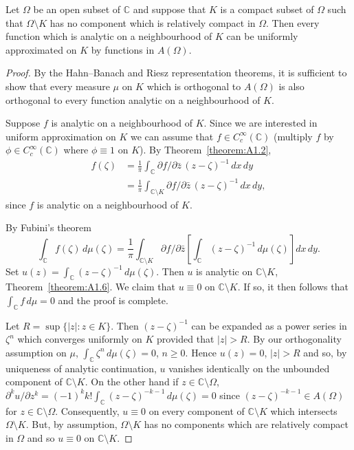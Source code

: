  Let $\Omega$ be an open subset of $\mathbb C$ and suppose that $K$ is a compact subset of $\Omega$ such that $\Omega\setminus K$ has no component which is relatively compact in $\Omega$. Then every function which is analytic on a neighbourhood of $K$ can be uniformly approximated on $K$ by functions in $A(\Omega)$.
\begin{proof}
By the Hahn--Banach and Riesz representation theorems, it is sufficient to show that every measure $\mu$ on $K$ which is orthogonal to $A(\Omega)$ is also orthogonal to every function analytic on a neighbourhood of $K$.

Suppose $f$ is analytic on a neighbourhood of $K$. Since we are interested in uniform approximation on $K$ we can assume that $f\in C_c^\infty(\mathbb C)$ (multiply $f$ by $\phi\in C_c^\infty(\mathbb C)$ where $\phi\equiv1$ on $K$). By Theorem~\ref{theorem:A1.2},
\begin{align*}
f(\zeta)&=\frac1\pi\int_{\mathbb C}\partial f/\partial\bar z\,(z-\zeta)^{-1}\,dx\,dy\\
&=\frac1\pi\int_{\mathbb C\setminus K}\partial f/\partial\bar z\,(z-\zeta)^{-1}\,dx\,dy,
\end{align*}
since $f$ is analytic on a neighbourhood of $K$.

By Fubini's theorem
\[ \int_{\mathbb C}f(\zeta)\,d\mu(\zeta)=\frac1\pi\int_{\mathbb C\setminus K}\partial f/\partial\bar z\left[\int_{\mathbb C}(z-\zeta)^{-1}\,d\mu(\zeta)\right]dx\,dy. \]
Set $u(z)=\int_{\mathbb C}(z-\zeta)^{-1}\,d\mu(\zeta)$. Then $u$ is analytic on $\mathbb C\setminus K$, Theorem~\ref{theorem:A1.6}. We claim that $u\equiv0$ on $\mathbb C\setminus K$. If so, it then follows that $\int_{\mathbb C}f\,d\mu=0$ and the proof is complete.

Let $R=\sup\{|z|:z\in K\}$. Then $(z-\zeta)^{-1}$ can be expanded as a power series in $\zeta^n$ which converges uniformly on $K$ provided that $|z|>R$. By our orthogonality assumption on $\mu$, $\int_{\mathbb C}\zeta^n\,d\mu(\zeta)=0$, $n\geq0$. Hence $u(z)=0$, $|z|>R$ and so, by uniqueness of analytic continuation, $u$ vanishes identically on the unbounded component of $\mathbb C\setminus K$. On the other hand if $z\in\mathbb C\setminus\Omega$, $\partial^ku/\partial z^k=(-1)^k k!\int_{\mathbb C}(z-\zeta)^{-k-1}\,d\mu(\zeta)=0$ since $(z-\zeta)^{-k-1}\in A(\Omega)$ for $z\in\mathbb C\setminus\Omega$. Consequently, $u\equiv0$ on every component of $\mathbb C\setminus K$ which intersects $\Omega\setminus K$. But, by assumption, $\Omega\setminus K$ has no components which are relatively compact in $\Omega$ and so $u\equiv0$ on $\mathbb C\setminus K$.
\end{proof}

